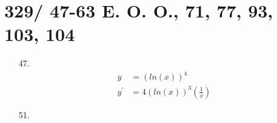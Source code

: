\documentclass[11pt]{article}
\begin{document}
\section*{329/ 47-63 E. O. O., 71, 77, 93, 103, 104}
\begin{itemize}
\item[47. ]
	\begin{align*}
		y &= (ln(x))^4\\
		y^\prime &= 4(ln(x))^3\left(\frac{1}{x}\right)
	\end{align*}
\item[51. ]

\end{itemize}
\end{document}
